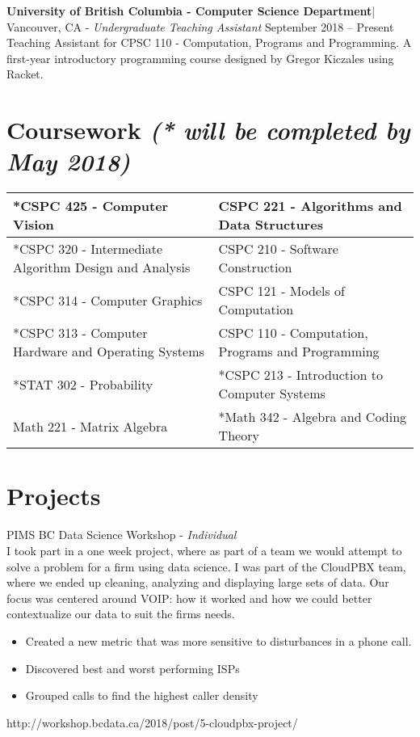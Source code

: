 \documentclass[letter]{res}
\begin{document}
\begin{resume}
\textbf{University of British Columbia - Computer Science Department}| Vancouver, CA \newline 
 - {\sl Undergraduate Teaching Assistant} \hfill September 2018 – Present\\
 Teaching Assistant for CPSC 110 - Computation, Programs and Programming. A first-year introductory programming course designed by Gregor Kiczales using Racket.

\section{Coursework {\sl(* will be completed by May 2018) }} \hfill
\vspace{-2mm}
\begin{tabu} { | X[l] | X[l] |}
 \hline
 *CSPC 425 - Computer Vision & CSPC 221 - Algorithms and Data Structures \\
 \hline
 *CSPC 320 - Intermediate Algorithm Design and Analysis  & CSPC 210 - Software Construction  \\
 \hline
 *CSPC 314 - Computer Graphics & CSPC 121 - Models of Computation \\
 \hline
 *CSPC 313 - Computer Hardware and Operating Systems & CSPC 110 - Computation, Programs and Programming \\
   \hline
 *STAT 302 - Probability & *CSPC 213 - Introduction to Computer Systems \\
  \hline
 Math 221 - Matrix Algebra & *Math 342 - Algebra and Coding Theory \\
\hline
\end{tabu}

\section{Projects}
PIMS BC Data Science Workshop \newline - {\sl Individual} \\
I took part in a one week project, where as part of a team we would attempt to solve a problem for a firm using data science. I was part of the CloudPBX team, where we ended up cleaning, analyzing and displaying large sets of data. Our focus was centered around VOIP: how it worked and how we could better contextualize our data to suit the firms needs. 
\\
\begin{itemize}
 \item Created a new metric that was more sensitive to disturbances in a phone call.
 \item Discovered best and worst performing ISPs
 \item Grouped calls to find the highest caller density
\end{itemize}
http://workshop.bcdata.ca/2018/post/5-cloudpbx-project/


\end{resume}
\end{document}
